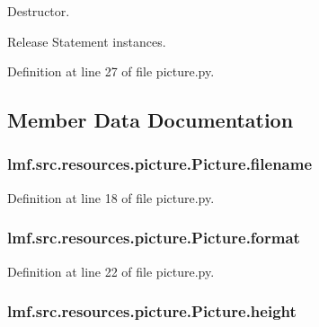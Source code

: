 Destructor. 

Release Statement instances. 

Definition at line 27 of file picture.\+py.



\subsection{Member Data Documentation}
\hypertarget{classlmf_1_1src_1_1resources_1_1picture_1_1_picture_a669715ddfa35b08171c493ac8f0b4468}{
\subsubsection[{filename}]{\setlength{\rightskip}{0pt plus 5cm}lmf.\+src.\+resources.\+picture.\+Picture.\+filename}}\label{classlmf_1_1src_1_1resources_1_1picture_1_1_picture_a669715ddfa35b08171c493ac8f0b4468}


Definition at line 18 of file picture.\+py.

\hypertarget{classlmf_1_1src_1_1resources_1_1picture_1_1_picture_a47e1b58864e999a59dbeb80fdf779238}{
\subsubsection[{format}]{\setlength{\rightskip}{0pt plus 5cm}lmf.\+src.\+resources.\+picture.\+Picture.\+format}}\label{classlmf_1_1src_1_1resources_1_1picture_1_1_picture_a47e1b58864e999a59dbeb80fdf779238}


Definition at line 22 of file picture.\+py.

\hypertarget{classlmf_1_1src_1_1resources_1_1picture_1_1_picture_aac1448966226ee0d40b4aa756c33f7f8}{
\subsubsection[{height}]{\setlength{\rightskip}{0pt plus 5cm}lmf.\+src.\+resources.\+picture.\+Picture.\+height}}\label{classlmf_1_1src_1_1resources_1_1picture_1_1_picture_aac1448966226ee0d40b4aa756c33f7f8}


